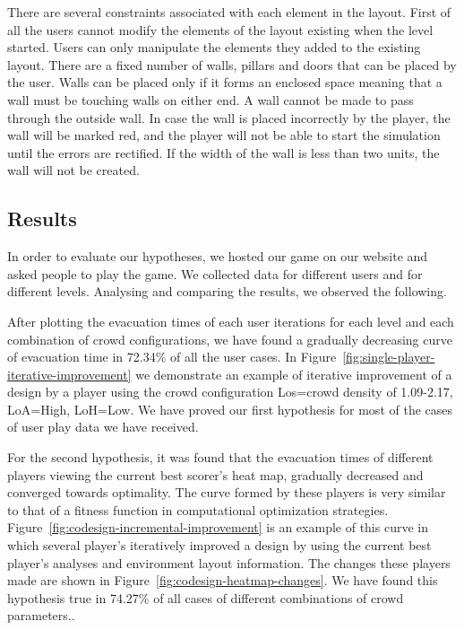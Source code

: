 There are several constraints associated with each element in the layout. First of all the users cannot modify the elements of the layout existing when the level started. Users can only manipulate the elements they added to the existing layout. There are a fixed number of walls, pillars and doors that can be placed by the user.  Walls can be placed only if it forms an enclosed space meaning that a wall must be touching walls on either end. A wall cannot be made to pass through the outside wall. In case the wall is placed incorrectly by the player, the wall will be marked red, and the player will not be able to start the simulation until the errors are rectified. If the width of the wall is less than two units, the wall will not be created.


\subsection{Results}
In order to evaluate our hypotheses, we hosted our game on our website and asked people to play the game. We collected data for different users and for different levels. Analysing and comparing the results, we observed the following.

After plotting the evacuation times of each user iterations for each level and each combination of crowd configurations, we have found a gradually decreasing curve of evacuation time in 72.34\% of all the user cases. In Figure~\ref{fig:single-player-iterative-improvement} we demonstrate an example of iterative improvement of a design by a player using the crowd configuration Los=crowd density of 1.09-2.17, LoA=High, LoH=Low. We have proved our first hypothesis for most of the cases of user play data we have received. 

For the second hypothesis, it was found that the evacuation times of different players viewing the current best scorer's heat map, gradually decreased and converged towards optimality. The curve formed by these players is very similar to that of a fitness function in computational optimization strategies. Figure~\ref{fig:codesign-incremental-improvement} is an example of this curve in which several player's iteratively improved a design by using the current best player's analyses and environment layout information. The changes these players made are shown in Figure~\ref{fig:codesign-heatmap-changes}. We have found this hypothesis true in 74.27\% of all cases of different combinations of crowd parameters.. 

